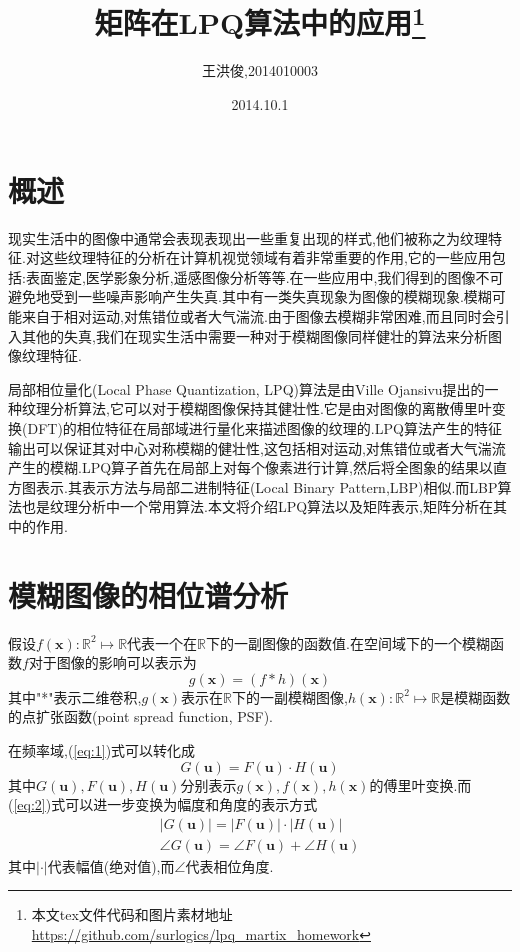 \documentclass[UTF8,adobefonts]{ctexart}
\title{矩阵在LPQ算法中的应用\footnote{本文tex文件代码和图片素材地址\url{https://github.com/surlogics/lpq_martix_homework}}}
\author{王洪俊,2014010003}
\date{2014.10.1}
\begin{document}
\maketitle      %

\section{概述}
现实生活中的图像中通常会表现表现出一些重复出现的样式,他们被称之为纹理特征.对这些纹理特征的分析在计算机视觉领域有着非常重要的作用,它的一些应用包括:表面鉴定,医学影象分析,遥感图像分析等等.在一些应用中,我们得到的图像不可避免地受到一些噪声影响产生失真.其中有一类失真现象为图像的模糊现象.模糊可能来自于相对运动,对焦错位或者大气湍流.由于图像去模糊非常困难,而且同时会引入其他的失真,我们在现实生活中需要一种对于模糊图像同样健壮的算法来分析图像纹理特征.

局部相位量化(Local Phase Quantization, LPQ)算法是由Ville Ojansivu提出的一种纹理分析算法,它可以对于模糊图像保持其健壮性.它是由对图像的离散傅里叶变换(DFT)的相位特征在局部域进行量化来描述图像的纹理的.LPQ算法产生的特征输出可以保证其对中心对称模糊的健壮性,这包括相对运动,对焦错位或者大气湍流产生的模糊.LPQ算子首先在局部上对每个像素进行计算,然后将全图象的结果以直方图表示.其表示方法与局部二进制特征(Local Binary Pattern,LBP)相似.而LBP算法也是纹理分析中一个常用算法.本文将介绍LPQ算法以及矩阵表示,矩阵分析在其中的作用.

\section{模糊图像的相位谱分析}\label{sec2} 
假设$f(\mathbf{x}):\mathbb{R}^2 \mapsto \mathbb{R}$代表一个在$\mathbb{R}$下的一副图像的函数值.在空间域下的一个模糊函数$f$对于图像的影响可以表示为
\begin{equation}\label{eq:1}
g(\mathbf{x})=(f*h)(\mathbf{x})
\end{equation}
其中"*"表示二维卷积,$g(\mathbf{x})$表示在$\mathbb{R}$下的一副模糊图像,$h(\mathbf{x}):\mathbb{R}^2 \mapsto \mathbb{R}$是模糊函数的点扩张函数(point spread function, PSF).

在频率域,(\ref{eq:1})式可以转化成
\begin{equation}\label{eq:2}
G(\mathbf{u})=F(\mathbf{u}) \cdot H(\mathbf{u})
\end{equation}
其中$G(\mathbf{u}),F(\mathbf{u}),H(\mathbf{u})$分别表示$g(\mathbf{x}),f(\mathbf{x}),h(\mathbf{x})$的傅里叶变换.而(\ref{eq:2})式可以进一步变换为幅度和角度的表示方式
\begin{equation}\label{eq:3}
\begin{split}
 |G(\mathbf{u})| =| F(\mathbf{u})| \cdot |H(\mathbf{u})| \\
\angle G(\mathbf{u})=\angle F(\mathbf{u}) + \angle H(\mathbf{u})
\end{split}
\end{equation}
其中$|\cdot|$代表幅值(绝对值),而$\angle$代表相位角度.
\end{document}

